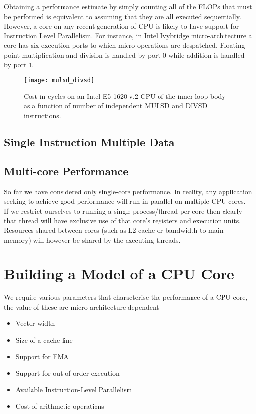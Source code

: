\documentclass[12pt]{article}
\begin{document}
Obtaining a performance estimate by simply counting all of the FLOPs
that must be performed is equivalent to assuming that they are all
executed sequentially. However, a core on any recent generation of CPU
is likely to have support for Instruction Level Parallelism. For
instance, in Intel Ivybridge micro-architecture a core has six
execution ports to which micro-operations are
despatched. Floating-point multiplication and division is handled by
port 0 while addition is handled by port 1.

\begin{figure}
\texttt{[image: mulsd\_divsd]}
\caption{Cost in cycles on an Intel E5-1620 v.2 CPU of the inner-loop
  body as a function of number of independent MULSD and DIVSD
  instructions.}
\label{FIG_mul_div_overlap}
\end{figure}

\subsection{Single Instruction Multiple Data}

\subsection{Multi-core Performance}

So far we have considered only single-core performance. In reality,
any application seeking to achieve good performance will run in
parallel on multiple CPU cores.  If we restrict ourselves to running a
single process/thread per core then clearly that thread will have
exclusive use of that core's registers and execution units. Resources
shared between cores (such as L2 cache or bandwidth to main memory) will
however be shared by the executing threads.

\section{Building a Model of a CPU Core}

We require various parameters that characterise the performance of a
CPU core, the value of these are micro-architecture dependent.

\begin{itemize}
\item Vector width
\item Size of a cache line
\item Support for FMA
\item Support for out-of-order execution
\item Available Instruction-Level Parallelism
\item Cost of arithmetic operations
\end{itemize}
\end{document}
